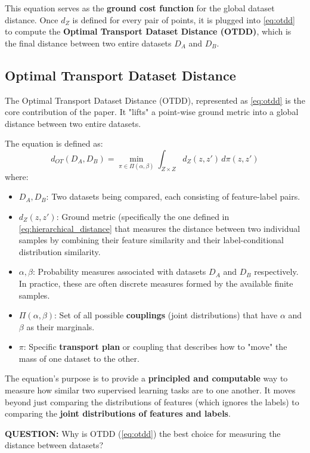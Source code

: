 \documentclass[11pt, a4paper]{article}
\theoremstyle{plain} %
\theoremstyle{definition} %
\begin{document}
			This equation serves as the \textbf{ground cost function} for the global dataset distance. Once $d_Z$ is defined for every pair of points, it is plugged into \cref{eq:otdd} to compute the \textbf{Optimal Transport Dataset Distance (OTDD)}, which is the final distance between two entire datasets $D_A$ and $D_B$.


		\subsection{Optimal Transport Dataset Distance}
		\label{sec:otdd}
			The Optimal Transport Dataset Distance (OTDD), represented as \cref{eq:otdd} is the core contribution of the paper. It "lifts" a point-wise ground metric into a global distance between two entire datasets.

			The equation is defined as:
			\begin{equation}
				\label{eq:otdd}
				d_{OT}(D_A, D_B) = \min_{\pi \in \Pi(\alpha, \beta)} \int_{Z \times Z} d_Z(z, z') \, d\pi(z, z')
			\end{equation}
			where:
			\begin{itemize}
				\item $D_A, D_B$: Two datasets being compared, each consisting of feature-label pairs.
				\item $d_Z(z, z')$: Ground metric (specifically the one defined in \cref{eq:hierarchical_distance} that measures the distance between two individual samples by combining their feature similarity and their label-conditional distribution similarity.
				\item $\alpha, \beta$: Probability measures associated with datasets $D_A$ and $D_B$ respectively. In practice, these are often discrete measures formed by the available finite samples.
				\item $\Pi(\alpha, \beta)$: Set of all possible \textbf{couplings} (joint distributions) that have $\alpha$ and $\beta$ as their marginals.
				\item $\pi$: Specific \textbf{transport plan} or coupling that describes how to "move" the mass of one dataset to the other.
			\end{itemize}
			The equation's purpose is to provide a \textbf{principled and computable} way to measure how similar two supervised learning tasks are to one another. It moves beyond just comparing the distributions of features (which ignores the labels) to comparing the \textbf{joint distributions of features and labels}.

			\textbf{QUESTION:} Why is OTDD (\cref{eq:otdd}) the best choice for measuring the distance between datasets?
\end{document}
